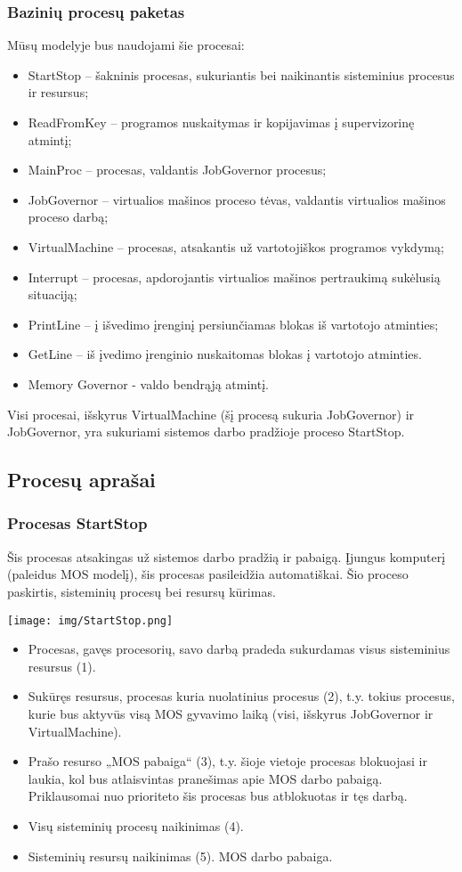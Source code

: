 \subsubsection{Bazinių procesų paketas}
Mūsų modelyje bus naudojami šie procesai:
	\begin{itemize}
		\item StartStop – šakninis procesas, sukuriantis bei naikinantis sisteminius procesus ir resursus;
		\item ReadFromKey – programos nuskaitymas ir kopijavimas į supervizorinę atmintį;
		\item MainProc – procesas, valdantis JobGovernor procesus;
		\item JobGovernor – virtualios mašinos proceso tėvas, valdantis virtualios mašinos proceso darbą;
		\item VirtualMachine – procesas, atsakantis už vartotojiškos programos vykdymą;
		\item Interrupt – procesas, apdorojantis virtualios mašinos pertraukimą sukėlusią situaciją;
		\item PrintLine – į išvedimo įrenginį persiunčiamas blokas iš vartotojo atminties;
		\item GetLine – iš įvedimo įrenginio nuskaitomas blokas į vartotojo atminties.
		\item Memory Governor - valdo bendrąją atmintį.
	\end{itemize}
Visi procesai, išskyrus VirtualMachine (šį procesą sukuria JobGovernor) ir JobGovernor, yra sukuriami sistemos darbo pradžioje proceso StartStop.

\subsection{Procesų aprašai}

\subsubsection{Procesas StartStop}
Šis procesas atsakingas už sistemos darbo pradžią ir pabaigą. Įjungus komputerį (paleidus MOS modelį), šis procesas pasileidžia automatiškai. Šio proceso paskirtis, sisteminių procesų bei resursų kūrimas.

\texttt{[image: img/StartStop.png]}

	\begin{itemize}
		\item Procesas, gavęs procesorių, savo darbą pradeda sukurdamas visus sisteminius resursus (1). 
		\item Sukūręs resursus, procesas kuria nuolatinius procesus (2), t.y. tokius procesus, kurie bus aktyvūs visą MOS gyvavimo laiką (visi, išskyrus JobGovernor ir VirtualMachine).
		\item Prašo resurso „MOS pabaiga“ (3), t.y. šioje vietoje procesas blokuojasi ir laukia, kol bus atlaisvintas pranešimas apie MOS darbo pabaigą. Priklausomai nuo prioriteto šis procesas bus atblokuotas ir tęs darbą.
		\item Visų sisteminių procesų naikinimas (4). 
		\item Sisteminių resursų naikinimas (5). MOS darbo pabaiga.
	\end{itemize}
